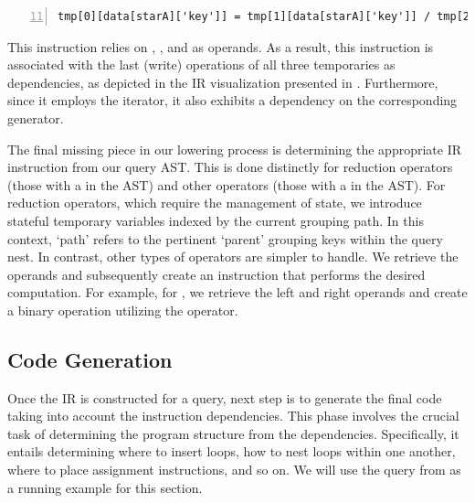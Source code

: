 \documentclass[runningheads]{llncs}
\begin{document}
\begin{lstlisting}[style=JavaScript, columns=flexible, numbers=left, firstnumber=11]
tmp[0][data[starA]['key']] = tmp[1][data[starA]['key']] / tmp[2]
\end{lstlisting}

This instruction relies on , , and  as operands.
As a result, this instruction is associated with the last (write) operations of all three
temporaries as dependencies, as depicted in the IR visualization presented in .
Furthermore, since it employs the  iterator, it also exhibits a dependency on the
corresponding generator.



The final missing piece in our lowering process is determining the appropriate
IR instruction from our query AST.
This is done distinctly for reduction operators (those with a
 in the AST) and other operators (those with a  in the AST).
For reduction operators, which require the management of state, we introduce stateful
temporary variables indexed by the current grouping path.
In this context, `path' refers to the pertinent `parent' grouping keys within the
query nest.
In contrast, other types of operators are simpler to handle.
We retrieve the operands and subsequently create an instruction that performs the
desired computation.
For example, for , we retrieve the left and right operands and create
a binary operation utilizing the \inline{+} operator.

\subsection{Code Generation}
Once the IR is constructed for a query, next step is to generate the final code
taking into account the instruction dependencies.
This phase involves the crucial task of determining the program structure from
the dependencies.
Specifically, it entails determining where to insert loops, how to nest loops
within one another, where to place assignment instructions, and so on. 
We will use the query from  as a running example for this
section.
\end{document}
